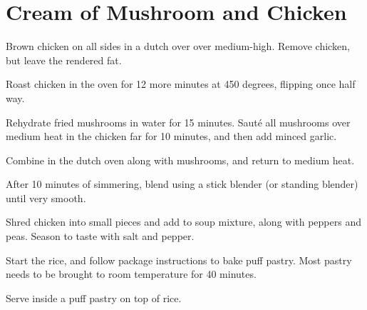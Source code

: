

\section{Cream of Mushroom and Chicken}
\begin{recipe}



Brown chicken on all sides in a dutch over over medium-high. Remove chicken, but leave the rendered fat.

Roast chicken in the oven for 12 more minutes at 450 degrees, flipping once half way.


Rehydrate fried mushrooms in water for 15 minutes. Sauté all mushrooms over medium heat in the chicken far for 10 minutes, and then add minced garlic.


Combine in the dutch oven along with mushrooms, and return to medium heat.

After 10 minutes of simmering, blend using a stick blender (or standing blender) until very smooth.


Shred chicken into small pieces and add to soup mixture, along with peppers and peas. Season to taste with salt and pepper.


Start the rice, and follow package instructions to bake puff pastry. Most pastry needs to be brought to room temperature for 40 minutes.

Serve inside a puff pastry on top of rice.

\end{recipe}
